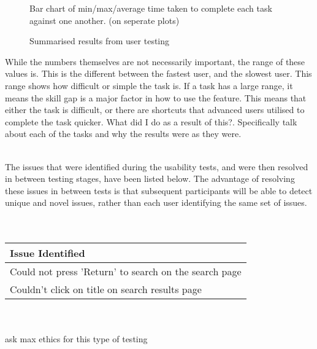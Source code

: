 \begin{figure}[!ht]
	\begin{center}
	\end{center}
	{\color{red}
		
		Bar chart of min/max/average time taken to complete each task against one another. (on seperate plots) 
	}
	\vspace{-6mm}
	\caption{Summarised results from user testing}	
\end{figure}

{\color{red}
\noindent
While the numbers themselves are not necessarily important, the range of these values is. This is the different between the fastest user, and the slowest user. This range shows how difficult or simple the task is. If a task has a large range, it means the skill gap is a major factor in how to use the feature. This means that either the task is difficult, or there are shortcuts that advanced users utilised to complete the task quicker. {\color{blue}What did I do as a result of this?}. Specifically talk about each of the tasks and why the results were as they were.
}
\ \\
\ \\
{\color{red}
\noindent
The issues that were identified during the usability tests, and were then resolved in between testing stages, have been listed below. The advantage of resolving these issues in between tests is that subsequent participants will be able to detect unique and novel issues, rather than each user identifying the same set of issues.
\ \\
\ \\
\begin{tabular}{l}
	Issue Identified \\
	\hline 
	Could not press 'Return' to search on the search page\\
	Couldn't click on title on search results page\\
\end{tabular}
}
\ \\
\ \\
{\color{red} ask max ethics for this type of testing}\ \\



	